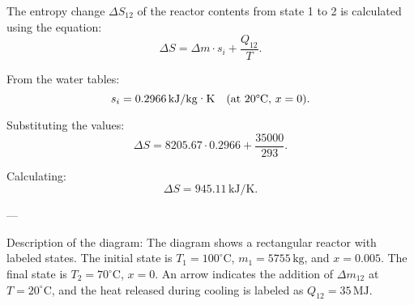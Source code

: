 The entropy change \( \Delta S_{12} \) of the reactor contents from state 1 to 2 is calculated using the equation:  
\[
\Delta S = \Delta m \cdot s_i + \frac{Q_{12}}{T}.
\]  

From the water tables:  
\[
s_i = 0.2966 \, \text{kJ/kg·K} \quad \text{(at 20°C, \( x = 0 \))}.
\]  

Substituting the values:  
\[
\Delta S = 8205.67 \cdot 0.2966 + \frac{35000}{293}.
\]  

Calculating:  
\[
\Delta S = 945.11 \, \text{kJ/K}.
\]  

---

Description of the diagram:  
The diagram shows a rectangular reactor with labeled states. The initial state is \( T_1 = 100^\circ\text{C} \), \( m_1 = 5755 \, \text{kg} \), and \( x = 0.005 \). The final state is \( T_2 = 70^\circ\text{C} \), \( x = 0 \). An arrow indicates the addition of \( \Delta m_{12} \) at \( T = 20^\circ\text{C} \), and the heat released during cooling is labeled as \( Q_{12} = 35 \, \text{MJ} \).
